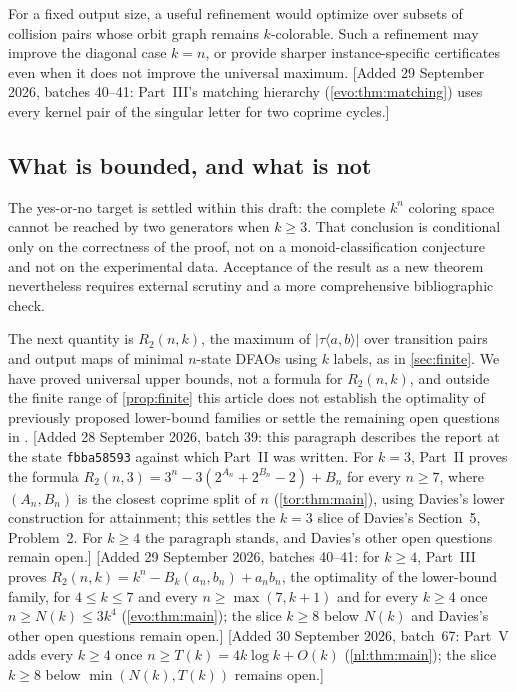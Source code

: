 \documentclass[11pt,a4paper]{article}
\numberwithin{equation}{section}
\theoremstyle{definition}
\theoremstyle{remark}
\begin{document}
For a fixed output size, a useful refinement would optimize over subsets of
collision pairs whose orbit graph remains $k$-colorable. Such a refinement
may improve the diagonal case $k=n$, or provide sharper instance-specific
certificates even when it does not improve the universal maximum.
[Added 29 September 2026, batches 40--41: Part~III's matching hierarchy (\cref{evo:thm:matching})
uses every kernel pair of the singular letter for two coprime cycles.]

\subsection{What is bounded, and what is not}

The yes-or-no target is settled within this draft: the complete $k^n$
coloring space cannot be reached by two generators when $k\ge3$. That
conclusion is conditional only on the correctness of the proof, not on a
monoid-classification conjecture and not on the experimental data. Acceptance
of the result as a new theorem nevertheless requires external scrutiny and a
more comprehensive bibliographic check.

The next quantity is $R_2(n,k)$, the maximum of $|\tau\langle a,b\rangle|$
over transition pairs and output maps of minimal $n$-state DFAOs using $k$
labels, as in \cref{sec:finite}. We have proved universal upper bounds, not a
formula for $R_2(n,k)$, and outside the finite range of \cref{prop:finite}
this article does not establish the optimality of previously proposed
lower-bound families or settle the remaining open questions in
\cite[Section~5]{Davies2017}.
[Added 28 September 2026, batch 39: this paragraph describes the report at
the state \texttt{fbba58593} against which Part~II was written. For $k=3$,
Part~II proves the formula
$R_2(n,3)=3^n-3(2^{A_n}+2^{B_n}-2)+B_n$ for every $n\ge7$, where
$(A_n,B_n)$ is the closest coprime split of $n$ (\cref{tor:thm:main}), using
Davies's lower construction for attainment; this settles the $k=3$ slice of
Davies's Section~5, Problem~2. For $k\ge4$ the paragraph stands, and
Davies's other open questions remain open.] [Added 29 September 2026, batches 40--41: for $k\ge4$,
Part~III proves $R_2(n,k)=k^n-B_k(a_n,b_n)+a_nb_n$, the optimality of the
lower-bound family, for $4\le k\le7$ and every $n\ge\max(7,k+1)$ and for every
$k\ge4$ once $n\ge N(k)\le3k^4$ (\cref{evo:thm:main}); the slice $k\ge8$
below $N(k)$ and Davies's other open questions remain open.]
[Added 30 September 2026, batch~67: Part~V adds every $k\ge4$ once $n\ge T(k)=4k\log k+O(k)$
(\cref{nl:thm:main}); the slice $k\ge8$ below $\min(N(k),T(k))$ remains open.]
\end{document}
